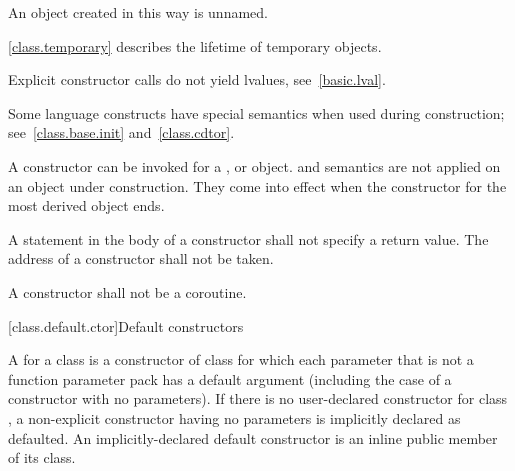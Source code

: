 \pnum
{}%
An object created in this way is unnamed.
\begin{note}
\ref{class.temporary} describes the lifetime of temporary objects.
\end{note}
\begin{note}
Explicit constructor calls do not yield lvalues, see~\ref{basic.lval}.
\end{note}

\pnum
\begin{note}
%
Some language constructs have special semantics when used during construction;
see~\ref{class.base.init} and~\ref{class.cdtor}.
\end{note}

\pnum
{}%
%
A constructor can be invoked for a
,
or
object.
%
and
semantics are not applied on an object under construction.
They come into effect when the constructor for the
most derived object ends.

\pnum
{}%
A
statement in the body of a constructor shall not specify a return value.
%
The address of a constructor shall not be taken.

\pnum
A constructor shall not be a coroutine.

[class.default.ctor]{Default constructors}

\pnum
{}%
%
A  for a class 
is a constructor of class 
for which each parameter
that is not a function parameter pack
has a default argument
(including the case of a constructor with no parameters).
%
If there is no user-declared constructor for class
,
a non-explicit constructor having no parameters is implicitly declared
as defaulted.
An implicitly-declared default constructor is an
inline public member of its class.

